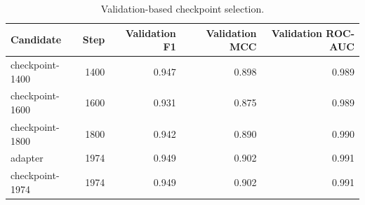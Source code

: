 \begin{table}[H]
\centering
\begin{tabular}{lrrrr}
\toprule
Candidate & Step & Validation F1 & Validation MCC & Validation ROC-AUC \\
\midrule
checkpoint-1400 & 1400 & 0.947 & 0.898 & 0.989 \\
checkpoint-1600 & 1600 & 0.931 & 0.875 & 0.989 \\
checkpoint-1800 & 1800 & 0.942 & 0.890 & 0.990 \\
adapter & 1974 & 0.949 & 0.902 & 0.991 \\
checkpoint-1974 & 1974 & 0.949 & 0.902 & 0.991 \\
\bottomrule
\end{tabular}
\caption{Validation-based checkpoint selection.}
\label{tab:checkpoint-selection}
\end{table}
